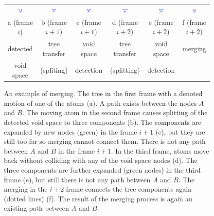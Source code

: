 \documentclass[usletter, 10pt, conference]{svjour3}      %
\begin{document}
\begin{figure}
\centering
{
\renewcommand{\tabcolsep}{1pt}
\begin{tabular}{cccccc}
\includegraphics[width=0.15\textwidth]{fig/merging1} &
\includegraphics[width=0.15\textwidth]{fig/merging2} &
\includegraphics[width=0.15\textwidth]{fig/merging3} &
\includegraphics[width=0.15\textwidth]{fig/merging4} &
\includegraphics[width=0.15\textwidth]{fig/merging5} &
\includegraphics[width=0.15\textwidth]{fig/merging6}  \\
a (frame $i$) & b (frame $i+1$) & c (frame $i+1$) & d (frame $i+2$)  & e (frame $i+2$) & f (frame $i+2)$ \\
detected      & tree transfer   & void space      & tree transfer    & void space      & merging   \\
void space    & (spliting)      & detection       &  (splitting)     &  detection      & \\              
\end{tabular}
\caption{\label{fig::merging}
An example of merging.
The tree in the first frame with a denoted motion of one of the atoms (a). 
A path exists between the nodes $A$ and $B$.
The moving atom in the second frame causes splitting of the detected void space to three components (b).
The components are expanded by new nodes (green) in the frame $i+1$ (c), but they are still too far so merging cannot connect them.
There is not any path between $A$ and $B$ in the frame $i+1$. 
In the third frame, atoms move back without colliding with any of the void space nodes (d).
The three components are further expanded (green nodes) in the third frame (e), but still there is not any path between $A$ and $B$.
The merging in the $i+2$ frame connects the tree components again (dotted lines) (f).
The result of the merging process is again an existing path between $A$ and $B$.
}
}
\end{figure}
\end{document}
